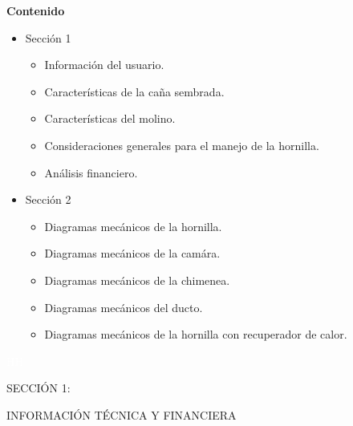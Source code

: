 \documentclass{article}%
\begin{document}
\newpage%
\begin{large}%
\begin{Large}%
\textbf{Contenido}%
\end{Large}%
\begin{itemize}%
\item%
Sección 1%
\begin{itemize}%
\item%
Información del usuario.%
\item%
Características de la caña sembrada.%
\item%
Características del molino.%
\item%
Consideraciones generales para el manejo de la hornilla.%
\item%
Análisis financiero.%
\end{itemize}%
\item%
Sección 2%
\begin{itemize}%
\item%
Diagramas mecánicos de la hornilla.%
\item%
Diagramas mecánicos de la camára.%
\item%
Diagramas mecánicos de la chimenea.%
\item%
Diagramas mecánicos del ducto.%
\item%
Diagramas mecánicos de la hornilla con recuperador de calor.%
\end{itemize}%
\end{itemize}%
\end{large}%
\newpage%
\begin{center}%
\textcolor{white}{ 
HH
}%
\linebreak%
\linebreak%
\linebreak%
\linebreak%
\linebreak%
\linebreak%
\linebreak%
\linebreak%
\linebreak%
\linebreak%
\linebreak%
\linebreak%
\linebreak%
\linebreak%
\linebreak%
\begin{Huge}%
SECCIÓN 1:%
\end{Huge}%
\linebreak%
\begin{Huge}%
INFORMACIÓN TÉCNICA Y FINANCIERA%
\end{Huge}%
\end{center}%
\end{document}
